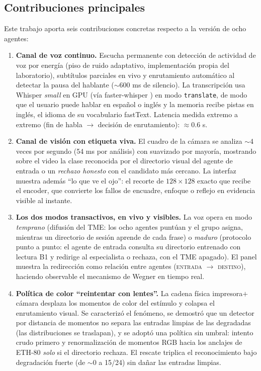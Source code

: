 \subsection*{Contribuciones principales}

Este trabajo aporta seis contribuciones concretas respecto a la versión de ocho
agentes:

\begin{enumerate}
    \item \textbf{Canal de voz continuo.}
    Escucha permanente con detección de actividad de voz por energía (piso de ruido
    adaptativo, implementación propia del laboratorio), subtítulos parciales en vivo y
    enrutamiento automático al detectar la pausa del hablante ($\sim$600 ms de
    silencio).
    La transcripción usa Whisper \emph{small} \cite{radford2023whisper} en GPU
    (vía faster-whisper \cite{systran2023fasterwhisper}) en modo \texttt{translate},
    de modo que el usuario puede hablar en español o inglés y la memoria recibe pistas
    en inglés, el idioma de su vocabulario fastText.
    Latencia medida extremo a extremo (fin de habla $\to$ decisión de enrutamiento):
    $\approx$0.6 s.

    \item \textbf{Canal de visión con etiqueta viva.}
    El cuadro de la cámara se analiza $\sim$4 veces por segundo (54 ms por análisis)
    con suavizado por mayoría, mostrando sobre el video la clase reconocida por el
    directorio visual del agente de entrada o un \emph{rechazo honesto} con el
    candidato más cercano.
    La interfaz muestra además ``lo que ve el ojo'': el recorte de $128\times128$
    exacto que recibe el encoder, que convierte los fallos de encuadre, enfoque o
    reflejo en evidencia visible al instante.

    \item \textbf{Los dos modos transactivos, en vivo y visibles.}
    La voz opera en modo \emph{temprano} (difusión del TME: los ocho agentes puntúan y
    el grupo asigna, mientras un directorio de sesión aprende de cada frase) o
    \emph{maduro} (protocolo punto a punto: el agente de entrada consulta su directorio
    entrenado con lectura B1 y redirige al especialista o rechaza, con el TME apagado).
    El panel muestra la redirección como relación entre agentes
    (\textsc{entrada} $\to$ \textsc{destino}), haciendo observable el mecanismo de
    Wegner en tiempo real.

    \item \textbf{Política de color ``reintentar con lentes''.}
    La cadena física impresora$+$cámara desplaza los momentos de color del estímulo y
    colapsa el enrutamiento visual.
    Se caracterizó el fenómeno, se demostró que un detector por distancia de momentos
    no separa las entradas limpias de las degradadas (las distribuciones se traslapan),
    y se adoptó una política sin umbral: intento crudo primero y renormalización de
    momentos RGB hacia los anclajes de ETH-80 \emph{solo} si el directorio rechaza.
    El rescate triplica el reconocimiento bajo degradación fuerte (de $\sim$0 a 15/24)
    sin dañar las entradas limpias.


\end{enumerate}
